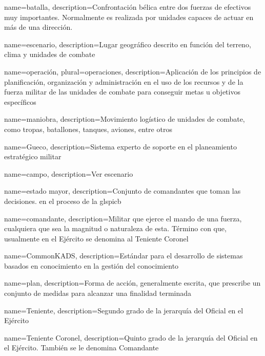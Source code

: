 

 {
  name={batalla},
  description={Confrontación bélica entre dos fuerzas de efectivos
               muy importantes. Normalmente es realizada por unidades
               capaces de actuar en más de una dirección.}
}

 {
  name={escenario},
  description={Lugar geográfico descrito en función del terreno,
               clima y unidades de combate}
}

 {
  name={operación},
  plural={operaciones},
  description={Aplicación de los principios de planificación,
               organización y administración en el uso de los recursos
               y de la fuerza militar de las unidades de combate
               para conseguir metas u objetivos específicos}
}

 {
  name={maniobra},
  description={Movimiento logístico de unidades de combate, como tropas,
               batallones, tanques, aviones, entre otros}
}

 {
  name={Gueco},
  description={Sistema experto de soporte en el planeamiento estratégico militar}
}

 {
  name={campo},
  description={Ver \gls{escenario}}
}

 {
  name={estado mayor},
  description={Conjunto de comandantes que toman las decisiones.
               en el proceso de la glspicb}
}

 {
  name={comandante},
  description={Militar que ejerce el mando de una fuerza, cualquiera que sea
               la magnitud o naturaleza de esta. Término con que, usualmente
               en el Ejército se denomina al Teniente Coronel}
}

 {
  name={CommonKADS},
  description={Estándar para el desarrollo de sistemas basados en conocimiento
               en la gestión del conocimiento}
}

 {
  name={plan},
  description={Forma de acción, generalmente escrita, que prescribe
               un conjunto de medidas para alcanzar una finalidad terminada}
}

 {
  name={Teniente},
  description={Segundo grado de la jerarquía del Oficial en el Ejército}
}

 {
  name={Teniente Coronel},
  description={Quinto grado de la jerarquía del Oficial en el Ejército.
               También se le denomina Comandante}
}

